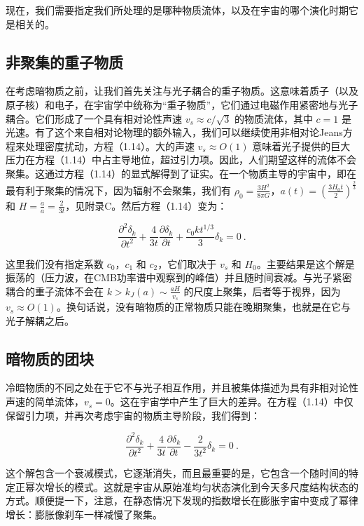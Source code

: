 现在，我们需要指定我们所处理的是哪种物质流体，以及在宇宙的哪个演化时期它是相关的。

\subsection{非聚集的重子物质}

在考虑暗物质之前，让我们首先关注与光子耦合的重子物质。这意味着质子（以及原子核）和电子，在宇宙学中统称为“重子物质”，它们通过电磁作用紧密地与光子耦合。它们形成了一个具有相对论性声速 \( v_s \approx c/\sqrt{3} \) 的物质流体，其中 \( c = 1 \) 是光速。有了这个来自相对论物理的额外输入，我们可以继续使用非相对论Jeans方程来处理密度扰动，方程（1.14）。大的声速 \( v_s \approx O(1) \) 意味着光子提供的巨大压力在方程（1.14）中占主导地位，超过引力项。因此，人们期望这样的流体不会聚集。这通过方程（1.14）的显式解得到了证实。在一个物质主导的宇宙中，即在最有利于聚集的情况下，因为辐射不会聚集，我们有 \( \rho_0 = \frac{3H^2}{8\pi G} \)，\( a(t) = \left(\frac{3H_0 t}{2}\right)^{\frac{2}{3}} \) 和 \( H = \frac{\dot{a}}{a} = \frac{2}{3t} \)，见附录C。然后方程（1.14）变为：

\[ \frac{\partial^2 \delta_k}{\partial t^2} + \frac{4}{3t} \frac{\partial \delta_k}{\partial t} + \frac{c_0 k t^{1/3}}{3} \delta_k = 0 ~. \]

这里我们没有指定系数 \( c_0 \)，\( c_1 \) 和 \( c_2 \)，它们取决于 \( v_s \) 和 \( H_0 \)。主要结果是这个解是振荡的（压力波，在CMB功率谱中观察到的峰值）并且随时间衰减。与光子紧密耦合的重子流体不会在 \( k > k_J(a) \sim \frac{aH}{v_s} \) 的尺度上聚集，后者等于视界，因为 \( v_s \approx O(1) \)。换句话说，没有暗物质的正常物质只能在晚期聚集，也就是在它与光子解耦之后。

\subsection{暗物质的团块}
冷暗物质的不同之处在于它不与光子相互作用，并且被集体描述为具有非相对论性声速的简单流体，\( v_s = 0 \)。这在宇宙学中产生了巨大的差异。在方程（1.14）中仅保留引力项，并再次考虑宇宙的物质主导阶段，我们得到：

\[ \frac{\partial^2 \delta_k}{\partial t^2} + \frac{4}{3t} \frac{\partial \delta_k}{\partial t} - \frac{2}{3t^2} \delta_k = 0 ~. \]

这个解包含一个衰减模式，它逐渐消失，而且最重要的是，它包含一个随时间的特定正幂次增长的模式。这就是宇宙从原始准均匀状态演化到今天多尺度结构状态的方式。顺便提一下，注意，在静态情况下发现的指数增长在膨胀宇宙中变成了幂律增长：膨胀像刹车一样减慢了聚集。


